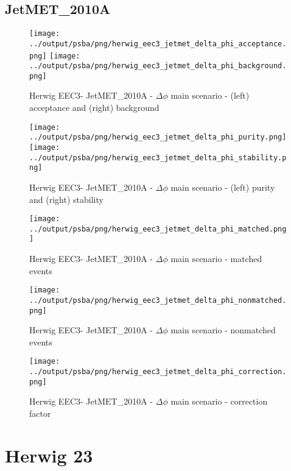 \documentclass[11pt]{book}
\begin{document}
\clearpage
\subsection{JetMET\_2010A}

\begin{figure}[ht]
\centering
\texttt{[image: ../output/psba/png/herwig\_eec3\_jetmet\_delta\_phi\_acceptance.png]}
\texttt{[image: ../output/psba/png/herwig\_eec3\_jetmet\_delta\_phi\_background.png]}
\caption{Herwig EEC3- JetMET\_2010A - $\Delta\phi$ main scenario - (left) acceptance and (right) background}
\label{fig:hw_eec3_jetmet_delta_phi_ab}
\end{figure}

\begin{figure}[ht]
\centering
\texttt{[image: ../output/psba/png/herwig\_eec3\_jetmet\_delta\_phi\_purity.png]}
\texttt{[image: ../output/psba/png/herwig\_eec3\_jetmet\_delta\_phi\_stability.png]}
\caption{Herwig EEC3- JetMET\_2010A - $\Delta\phi$ main scenario - (left) purity and (right) stability}
\label{fig:hw_eec3_jetmet_delta_phi_ps}
\end{figure}

\begin{figure}[ht]
\centering
\texttt{[image: ../output/psba/png/herwig\_eec3\_jetmet\_delta\_phi\_matched.png]}
\caption{Herwig EEC3- JetMET\_2010A - $\Delta\phi$ main scenario - matched events}
\label{fig:hw_eec3_jetmet_delta_phi_matched}
\end{figure}

\begin{figure}[ht]
\centering
\texttt{[image: ../output/psba/png/herwig\_eec3\_jetmet\_delta\_phi\_nonmatched.png]}
\caption{Herwig EEC3- JetMET\_2010A - $\Delta\phi$ main scenario - nonmatched events}
\label{fig:hw_eec3_jetmet_delta_phi_nonmatched}
\end{figure}

\begin{figure}[ht]
\centering
\texttt{[image: ../output/psba/png/herwig\_eec3\_jetmet\_delta\_phi\_correction.png]}
\caption{Herwig EEC3- JetMET\_2010A - $\Delta\phi$ main scenario - correction factor}
\label{fig:hw_eec3_jetmet_delta_phi_correction}
\end{figure}

\clearpage

\section{Herwig 23}
\end{document}
